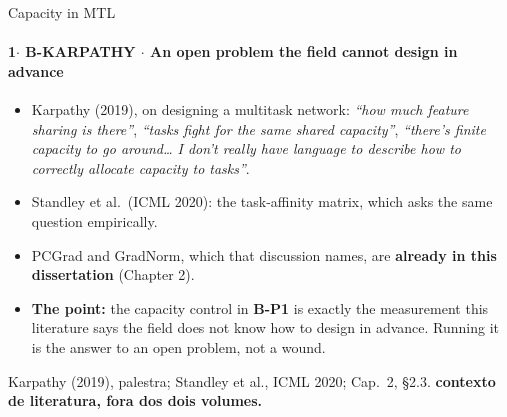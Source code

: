 \documentclass{beamer}
\begin{document}
\begin{frame}[noframenumbering]{Capacity in MTL}
    \framesubtitle{\normalsize 1$\cdot$ \textbf{B-KARPATHY} $\cdot$ An open problem the field cannot design in advance}
    \hypertarget{bkarpathy}{}
    \small
    \begin{itemize}\setlength{\itemsep}{0pt}\setlength{\parskip}{0pt}
        \item Karpathy (2019), on designing a multitask network: \textit{``how much feature sharing is there''}, \textit{``tasks fight for the same shared capacity''}, \textit{``there's finite capacity to go around\ldots{} I don't really have language to describe how to correctly allocate capacity to tasks''}.
        \item Standley et al.\ (ICML 2020): the task-affinity matrix, which asks the same question empirically.
        \item PCGrad and GradNorm, which that discussion names, are \textbf{already in this dissertation} (Chapter 2).
        \item \textbf{The point:} the capacity control in \textbf{B-P1} is exactly the measurement this literature says the field does not know how to design in advance. Running it is the answer to an open problem, not a wound.
    \end{itemize}
    \vfill
    {\scriptsize
    \begin{minipage}[b]{0.775\linewidth}\raggedright\textcolor{black!70}{Karpathy (2019), palestra; Standley et al., ICML 2020; Cap.~2, §2.3. \textbf{contexto de literatura, fora dos dois volumes.}}\end{minipage}\hfill
    \begin{minipage}[b]{0.20\linewidth}\raggedleft \hyperlink{bp1}{}\hyperlink{b0}{}\end{minipage}}
\end{frame}
\end{document}
